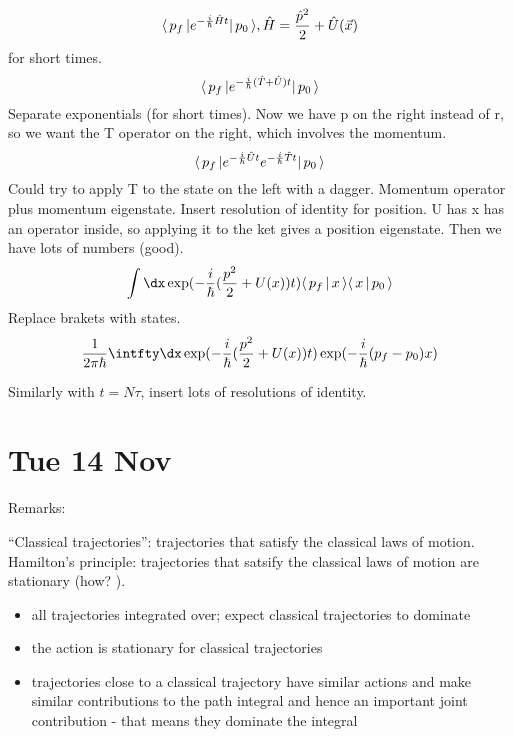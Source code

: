 \documentclass[a4paper]{extarticle}
\newcommand{\ihbar}{\frac{i}{\hbar}}
\begin{document}
\begin{equation}
  \bra{p_f} e^{-\ihbar \hat{H} t} \ket{p_0},
  \hat{H} = \frac{\hat{p}^2}{2} + \hat{U}(\vec{x})
\end{equation}
for short times.
\begin{equation}
  \bra{p_f} e^{-\ihbar (\hat{T} + \hat{U}) t} \ket{p_0}
\end{equation}
Separate exponentials (for short times).
Now we have p on the right instead of r, so we want the T operator on the
right, which involves the momentum.
\begin{equation}
  \bra{p_f} e^{-\ihbar \hat{U} t} e^{-\ihbar \hat{T} t} \ket{p_0}
\end{equation}
Could try to apply T to the state on the left with a dagger.
Momentum operator plus momentum eigenstate.
Insert resolution of identity for position.
U has x has an operator inside, so applying it to the ket gives a position
eigenstate.
Then we have lots of numbers (good).
\begin{equation}
  \int \dx \exp(-\ihbar ( \frac{p^2}{2} + U(x)) t) \braket{p_f}{x} \braket{x}{p_0}
\end{equation}
Replace brakets with states.
\begin{equation}
  \frac{1}{2\pi\hbar} \intfty\dx
  \exp(-\ihbar ( \frac{p^2}{2} + U(x)) t) \exp(-\frac{i}{\hbar} (p_f - p_0) x)
\end{equation}

Similarly with $t = N\tau$, insert lots of resolutions of identity.

\section{Tue 14 Nov}

Remarks:

``Classical trajectories'': trajectories that
satisfy the classical laws of motion.
Hamilton's principle: trajectories that satsify the classical laws of motion
are stationary (how?
).

\begin{itemize}
  \item all trajectories integrated over; expect classical trajectories to dominate
  \item the action is stationary for classical trajectories
  \item trajectories close to a classical trajectory have similar actions and
        make similar contributions to the path integral and hence an important
        joint contribution - that means they dominate the integral
\end{itemize}
\end{document}
